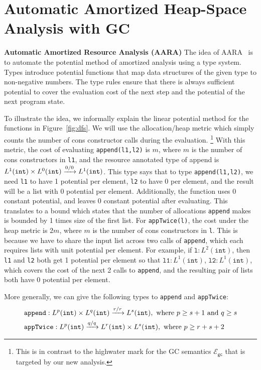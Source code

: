 \documentclass{easychair}
\newcommand{\ms}[1]{\ensuremath{\mathsf{#1}}}
\newcommand{\irl}[1]{\mathtt{#1}}
\newcounter{rule}
\newcommand{\gcSem}{\ensuremath{\mathcal{E}_{\ms{gc}}}}
\theoremstyle{definition}
\begin{document}
\section{Automatic Amortized Heap-Space Analysis with GC}
\label{sect:aara}

{\bf Automatic Amortized Resource Analysis (AARA)}
%
The idea of AARA~\cite{Jost03,Jost10,HoffmannAH10,HoffmannW15} is to automate the potential method of amortized
analysis using a type system.  Types introduce potential functions that
map data structures of the given type to non-negative numbers. The
type rules ensure that there is always sufficient potential to cover
the evaluation cost of the next step and the potential of the
next program state.

To illustrate the idea, we informally explain the linear potential method for the functions in Figure~\ref{fig:dfs}.
We will use the allocation/heap metric which simply counts the number of cons constructor calls during the evaluation.%
\footnote{This is in contrast to the highwater mark for the GC semantics \gcSem{} that is targeted by our new analysis.}
With this metric, the cost of evaluating \texttt{append(l1,l2)} is $m$, where $m$ is the number 
of cons constructors in \texttt{l1}, and the resource annotated type of append is 
$\prodtycst{L^1(\irl{int})}{L^0(\irl{int})} \xrightarrow{0/0} L^1(\irl{int})$.
This type says that to type \texttt{append(l1,l2)}, we need \texttt{l1} 
to have 1 potential per element, \texttt{l2} to have 0 per element, and the result 
will be a list with 0 potential per element.
Additionally, the function uses 0 constant potential, and 
leaves 0 constant potential after evaluating. This translates to a bound which states that 
the number of allocations \texttt{append} makes is bounded by 1 times size of the first list.
For \texttt{appTwice(l)}, the cost under the heap metric is $2m$, where $m$ is the number of cons 
constructors in \texttt{l}. This is because we have to share the input list across 
two calls of \texttt{append}, which each requires lists with unit potential per element.
For example, if $\texttt{l} : L^2(\irl{int})$, then \texttt{l1} and 
\texttt{l2} both get 1 potential per element so that $\texttt{l1} : L^1(\irl{int})$,
$\texttt{l2} : L^1(\irl{int})$, which covers the cost of the next 2 calls to \texttt{append}, 
and the resulting pair of lists both have 0 potential per element.

More generally, we can give the following types to \texttt{append} and \texttt{appTwice}:
\begin{align*}
	&\texttt{append} : \prodtycst{L^p(\irl{int})}{L^q(\irl{int})} \xrightarrow{r/r} L^s(\irl{int}), \text{ 
	where } p \ge s + 1 \text{ and } q \ge s\\
	&\texttt{appTwice} : L^p(\irl{int}) \xrightarrow{q/q} \prodtycst{L^r(\irl{int})}{L^s(\irl{int})},
	\text{ where } p \ge r + s + 2
\end{align*}
\end{document}
